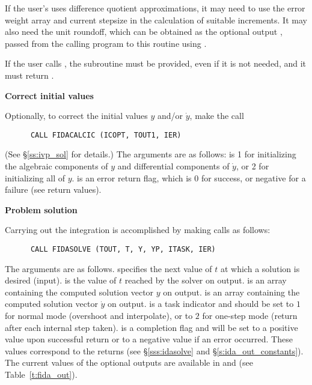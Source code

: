 \begin{Steps}
  If the user's  uses difference quotient approximations, it
  may need to use the error weight array  and current stepsize 
  in the calculation of suitable increments.  It may also need the unit
  roundoff, which can be obtained as the optional output ,
  passed from the calling program to this routine using .

  {\warn} If the user calls , the subroutine 
  must be provided, even if it is not needed, and it must return .

\item {\bf Correct initial values}

  Optionally, to correct the initial values $y$ and/or $\dot{y}$, make the call
\begin{verbatim}
      CALL FIDACALCIC (ICOPT, TOUT1, IER)
\end{verbatim}
  (See \S\ref{ss:ivp_sol} for details.)  The arguments are as follows:
   is 1 for initializing the algebraic components of $y$ and
  differential components of $\dot{y}$, or 2 for initializing all of $y$.
   is an error return flag, which is 0 for success, or negative
  for a failure (see  return values).

\item {\bf Problem solution}

  Carrying out the integration is accomplished by making calls as follows:
\begin{verbatim}
      CALL FIDASOLVE (TOUT, T, Y, YP, ITASK, IER)
\end{verbatim}
  The arguments are as follows.
   specifies the next value of $t$ at which a solution is desired (input).
   is the value of $t$ reached by the solver on output.
   is an array containing the computed solution vector $y$ on output.
   is an array containing the computed solution vector $\dot{y}$ on output.
   is a task indicator and should be set to $1$ for normal mode 
  (overshoot  and interpolate), or to $2$ for one-step mode 
  (return after each internal step taken).
   is a completion flag and will be set to a positive value upon
  successful return or to a negative value if an error occurred. These values
  correspond to the  returns (see \S\ref{sss:idasolve} and \S\ref{s:ida_out_constants}).
  The current values of the optional outputs are available in  and
   (see Table~\ref{t:fida_out}).
  

\end{Steps}
